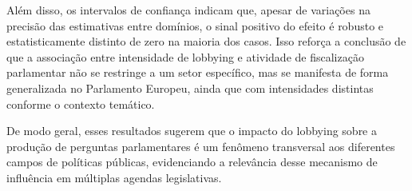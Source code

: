 Além disso, os intervalos de confiança indicam que, apesar de variações na precisão das estimativas entre domínios, o sinal positivo do efeito é robusto e estatisticamente distinto de zero na maioria dos casos. Isso reforça a conclusão de que a associação entre intensidade de lobbying e atividade de fiscalização parlamentar não se restringe a um setor específico, mas se manifesta de forma generalizada no Parlamento Europeu, ainda que com intensidades distintas conforme o contexto temático.

De modo geral, esses resultados sugerem que o impacto do lobbying sobre a produção de perguntas parlamentares é um fenômeno transversal aos diferentes campos de políticas públicas, evidenciando a relevância desse mecanismo de influência em múltiplas agendas legislativas.




